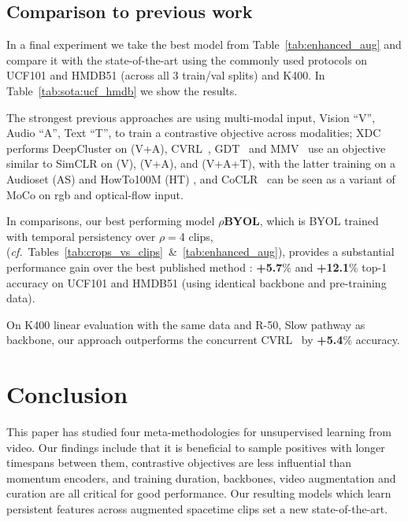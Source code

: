 \documentclass[final]{cvpr}
\newcommand{\tblref}[1]{Table~\ref{#1}}
\begin{document}
	
	\subsection{Comparison to previous work}
	
	In a final experiment we take the best model from \tblref{tab:enhanced_aug} and compare it with the state-of-the-art using the commonly used protocols on UCF101 and HMDB51 (across all 3 train/val splits) and K400. In \tblref{tab:sota:ucf_hmdb} we show the results. 
	
	The strongest previous approaches are using multi-modal input, Vision ``V'', Audio ``A'', Text ``T'', to train a contrastive objective across modalities;  XDC~\cite{Alwassel19} performs DeepCluster \cite{Caron18} on (V+A), CVRL~\cite{Qian20}, GDT~\cite{Patrick20} and MMV~\cite{alayrac2020self}  use an objective similar to \mbox{SimCLR} on (V), (V+A), and (V+A+T), with the latter training on a Audioset (AS) \cite{gemmeke2017audio} and HowTo100M (HT) \cite{miech2019howto100m}, and CoCLR~\cite{Han20} can be seen as a variant of MoCo on rgb and optical-flow input. 
	
	In comparisons, our best performing model \textbf{$\rho$BYOL}, which is BYOL trained with temporal persistency over $\rho{=}$4 clips,  (\textit{cf.}~Tables~\ref{tab:crops_vs_clips}~\&~\ref{tab:enhanced_aug}), provides a substantial performance gain over the best published method \cite{Han20}: \textbf{+5.7}\% and \textbf{+12.1}\% top-1 accuracy on UCF101 and HMDB51 (using identical backbone and pre-training data). 
	
	On K400 linear evaluation with the same data and  R-50, Slow pathway \cite{Feichtenhofer19} as backbone, our approach outperforms the concurrent CVRL~\cite{Qian20} by \textbf{+5.4}\% accuracy.
		
	\section{Conclusion}
	
	
	This paper has studied four meta-methodologies for unsupervised learning from video. Our findings include that it is beneficial to sample positives with longer timespans between them, contrastive objectives are less influential than momentum encoders, and training duration, backbones, video augmentation and curation are all critical for good performance. 
	Our resulting models which learn persistent features across augmented spacetime clips set a new state-of-the-art. 
	
\end{document}
